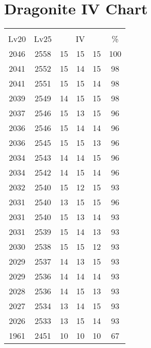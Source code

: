 \documentclass{article}%
\begin{document}
%
\normalsize%
\section{Dragonite IV Chart}%
\label{sec:Dragonite IV Chart}%
\renewcommand{\arraystretch}{1.5}%
\begin{tabular}{|c|c|c|c|c|c|}%
\hline%
\multicolumn{6}{|c|}{\textcolor{white}{ 
\linebreak{Dragonite}
}%
\cellcolor{black}}\\%
\multicolumn{1}{|c}{Lv20}&\multicolumn{1}{c|}{Lv25}&\multicolumn{3}{c|}{IV}&\multicolumn{1}{|c|}{\%}\\%
\hline%
\rowcolor{color100}%
2046&2558&15&15&15&100\\%
\hline%
\rowcolor{color98}%
2041&2552&15&14&15&98\\%
\hline%
\rowcolor{color98}%
2041&2551&15&15&14&98\\%
\hline%
\rowcolor{color98}%
2039&2549&14&15&15&98\\%
\hline%
\rowcolor{color96}%
2037&2546&15&13&15&96\\%
\hline%
\rowcolor{color96}%
2036&2546&15&14&14&96\\%
\hline%
\rowcolor{color96}%
2036&2545&15&15&13&96\\%
\hline%
\rowcolor{color96}%
2034&2543&14&14&15&96\\%
\hline%
\rowcolor{color96}%
2034&2542&14&15&14&96\\%
\hline%
\rowcolor{color93}%
2032&2540&15&12&15&93\\%
\hline%
\rowcolor{color96}%
2031&2540&13&15&15&96\\%
\hline%
\rowcolor{color93}%
2031&2540&15&13&14&93\\%
\hline%
\rowcolor{color93}%
2031&2539&15&14&13&93\\%
\hline%
\rowcolor{color93}%
2030&2538&15&15&12&93\\%
\hline%
\rowcolor{color93}%
2029&2537&14&13&15&93\\%
\hline%
\rowcolor{color93}%
2029&2536&14&14&14&93\\%
\hline%
\rowcolor{color93}%
2028&2536&14&15&13&93\\%
\hline%
\rowcolor{color93}%
2027&2534&13&14&15&93\\%
\hline%
\rowcolor{color93}%
2026&2533&13&15&14&93\\%
\hline%
\rowcolor{color91}%
1961&2451&10&10&10&67\\%
\end{tabular}

%
\end{document}
